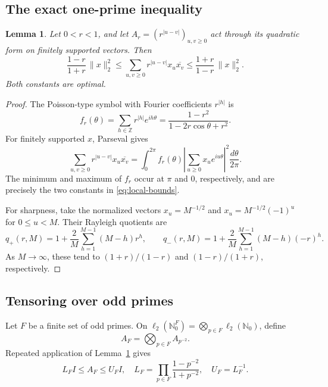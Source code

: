 \documentclass[11pt]{article}
\newtheorem{lemma}[theorem]{Lemma}
\newcommand{\N}{\mathbb N}
\newcommand{\Z}{\mathbb Z}
\begin{document}
\subsection{The exact one-prime inequality}

\begin{lemma}\label{lem:local}
Let \(0<r<1\), and let \(A_r=(r^{|u-v|})_{u,v\geq0}\) act through its
quadratic form on finitely supported vectors.  Then
\begin{equation}\label{eq:local-bounds}
 \frac{1-r}{1+r}\,\|x\|_2^2
 \leq \sum_{u,v\geq0}r^{|u-v|}x_u\overline{x_v}
 \leq \frac{1+r}{1-r}\,\|x\|_2^2.
\end{equation}
Both constants are optimal.
\end{lemma}

\begin{proof}
The Poisson-type symbol with Fourier coefficients \(r^{|h|}\) is
\[
 f_r(\theta)=\sum_{h\in\Z}r^{|h|}e^{ih\theta}
 =\frac{1-r^2}{1-2r\cos\theta+r^2}.
\]
For finitely supported \(x\), Parseval gives
\[
 \sum_{u,v\geq0}r^{|u-v|}x_u\overline{x_v}
 =\int_0^{2\pi}f_r(\theta)
   \left|\sum_{u\geq0}x_ue^{iu\theta}\right|^2\frac{d\theta}{2\pi}.
\]
The minimum and maximum of \(f_r\) occur at \(\pi\) and \(0\), respectively,
and are precisely the two constants in \eqref{eq:local-bounds}.

For sharpness, take the normalized vectors
\(x_u=M^{-1/2}\) and \(x_u=M^{-1/2}(-1)^u\) for \(0\leq u<M\).  Their
Rayleigh quotients are
\begin{equation}\label{eq:qpm}
 q_+(r,M)=1+\frac2M\sum_{h=1}^{M-1}(M-h)r^h,
 \qquad
 q_-(r,M)=1+\frac2M\sum_{h=1}^{M-1}(M-h)(-r)^h.
\end{equation}
As \(M\to\infty\), these tend to \((1+r)/(1-r)\) and
\((1-r)/(1+r)\), respectively.
\end{proof}

\subsection{Tensoring over odd primes}

Let \(F\) be a finite set of odd primes.  On
\(\ell_2(\N_0^F)=\bigotimes_{p\in F}\ell_2(\N_0)\), define
\[
 A_F=\bigotimes_{p\in F}A_{p^{-2}}.
\]
Repeated application of Lemma~\ref{lem:local} gives
\begin{equation}\label{eq:finiteF}
 L_F I\leq A_F\leq U_F I,
 \quad
 L_F=\prod_{p\in F}\frac{1-p^{-2}}{1+p^{-2}},
 \quad U_F=L_F^{-1}.
\end{equation}
\end{document}
